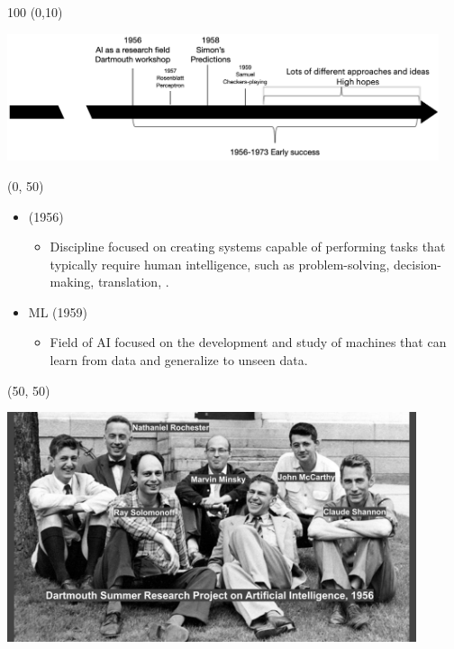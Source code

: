 \begin{frame}
  \begin{textblock}{100} (0,10)
    \begin{center}
      \includegraphics[width=0.95\textwidth]{img/ai_history_1956_1973.png}
    \end{center}
  \end{textblock}

  \begin{textblock}{50}(0, 50)
    \begin{itemize}
      \item {} (1956)
        \begin{itemize}
        \item \footnotesize Discipline focused on creating systems capable of
          performing tasks that typically require human intelligence, such as
          problem-solving, decision-making, translation, \etc{}.
        \end{itemize}
      \item<2-> \acl{ML} (1959)
        \begin{itemize}
        \item \footnotesize Field of AI focused on the development and study of machines that can learn from data and generalize to unseen data.
        \end{itemize}
      \end{itemize}
    \end{textblock}

    \begin{textblock}{50}(50, 50)
      \begin{center}
        \includegraphics[width=0.9\textwidth]{img/dartmouth-conference.jpg}
      \end{center}
    \end{textblock}

\end{frame}



